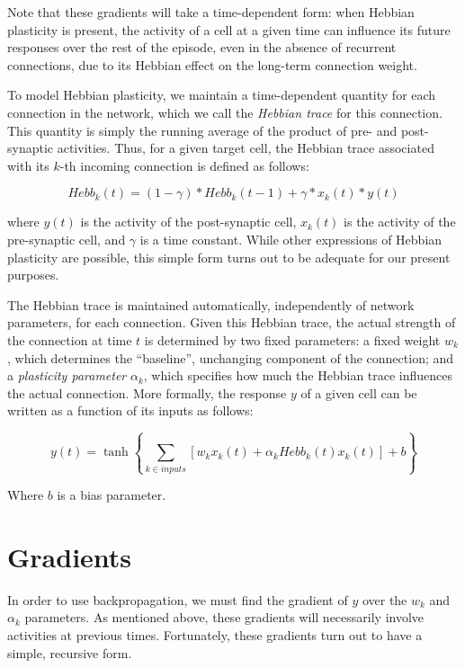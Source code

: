 \documentclass{article}
\begin{document}
Note that these gradients will take a time-dependent form: when Hebbian
plasticity is present, the activity of a cell at a given time can influence its
future responses over the rest of the episode, even in the absence of recurrent
connections, due to its Hebbian effect on the long-term connection weight. 

To model Hebbian plasticity, we maintain a time-dependent quantity for each
connection in the network, which we call the \emph{Hebbian trace} for this connection.
This quantity is simply the running average of the product of pre- and
post-synaptic activities.
Thus, for a given target cell, the Hebbian trace associated with its $k$-th incoming
connection is defined as follows:

\begin{equation}
\label{eq:hebb}
Hebb_k(t) = (1-\gamma) * Hebb_k(t-1) + \gamma * x_k(t) * y(t)
\end{equation}

where $y(t)$ is the activity of the post-synaptic cell, $x_k(t)$ is the activity
of the pre-synaptic cell, and $\gamma$ is a time constant. While other
expressions of Hebbian plasticity are possible, this simple form turns out to be
adequate for our present purposes.

The Hebbian trace is maintained automatically, independently of network
parameters, for each connection. Given this Hebbian trace, the
actual strength of the connection at time $t$ is determined by two fixed parameters: a fixed
weight $w_k$, which determines the ``baseline'', unchanging component of the
connection; and a \emph{plasticity parameter} $\alpha_k$, which specifies how
much the Hebbian trace influences the actual connection. More formally, the
response $y$ of a given cell can be written as a function of its inputs as
follows:

\begin{equation}
\label{eq:y}
y(t) = \tanh\left\{\sum_{k \in inputs}[w_k x_k(t) + \alpha_k Hebb_k(t) x_k(t)] +
b\right\}
\end{equation}


Where $b$ is a bias parameter. 


\section{Gradients}

In order to use backpropagation, we must find the gradient of $y$ over the $w_k$ and
$\alpha_k$ parameters. As mentioned above, these gradients will necessarily
involve activities at previous times. Fortunately, these gradients turn out to
have a simple, recursive form. 
\end{document}
